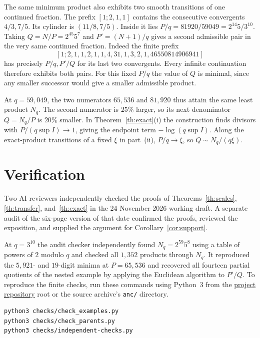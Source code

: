 \documentclass[11pt]{article}
\begin{document}
The same minimum product also exhibits two smooth transitions of one
continued fraction.
The prefix $[1;2,1,1]$ contains the consecutive convergents $4/3,7/5$.
Its cylinder is $(11/8,7/5)$. Inside it lies
$P/q=81920/59049=2^{14}5/3^{10}$.
Taking $Q=N/P=2^{45}5^7$ and $P'=(N+1)/q$ gives a second admissible
pair in the very same continued fraction. Indeed the finite prefix
\[
 [1;2,1,1,2,1,1,4,31,1,3,2,1,46550814906941]
\]
has precisely $P/q,P'/Q$ for its last two convergents. Every infinite
continuation therefore exhibits both pairs. For this fixed $P/q$ the
value of $Q$ is minimal, since any smaller successor would give a
smaller admissible product.

At $q=59{,}049$, the two numerators $65{,}536$ and $81{,}920$ thus attain the
same least product $N_q$. The second numerator is $25\%$ larger, so its next
denominator $Q=N_q/P$ is $20\%$ smaller. In Theorem~\ref{th:exact}(i) the
construction finds divisors with $P/(q\sup I)\to1$, giving the endpoint term
$-\log(q\sup I)$. Along the exact-product transitions of a fixed $\xi$ in
part~(ii), $P/q\to\xi$, so $Q\sim N_q/(q\xi)$.

\section*{Verification}
Two AI reviewers independently checked the proofs of
Theorems~\ref{th:scales}, \ref{th:transfer}, and~\ref{th:exact} in the
24 November 2026 working draft. A separate audit of the six-page version
of that date confirmed the proofs, reviewed the exposition, and supplied
the argument for Corollary~\ref{cor:support}.

At $q=3^{10}$ the audit checker independently found $N_q=2^{59}5^8$ using
a table of powers of $2$ modulo $q$ and checked all $1{,}352$ products
through $N_q$. It reproduced the $5{,}921$- and $19$-digit minima at $P=65{,}536$ and
recovered all fourteen partial quotients of the nested example by applying
the Euclidean algorithm to $P'/Q$. To reproduce the finite checks, run
these commands using Python~3 from the
\href{https://github.com/twinheterodox/smooth-neighboring-convergents}{project repository}
root or the source archive's \texttt{anc/} directory.
\begin{verbatim}
python3 checks/check_examples.py
python3 checks/check_parents.py
python3 checks/independent-checks.py
\end{verbatim}
\end{document}
